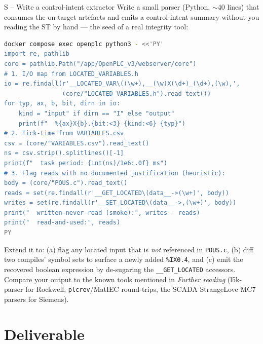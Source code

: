 \documentclass[11pt,a4paper]{article}
\begin{document}
\begin{stepbox}{S -- Write a control-intent extractor}
Write a small parser (Python, $\sim$40 lines) that consumes the on-target
artefacts and emits a control-intent summary without you reading the ST by
hand --- the seed of a real integrity tool:
\begin{lstlisting}[language=bash]
docker compose exec openplc python3 - <<'PY'
import re, pathlib
core = pathlib.Path("/app/OpenPLC_v3/webserver/core")
# 1. I/O map from LOCATED_VARIABLES.h
io = re.findall(r'__LOCATED_VAR\((\w+),__(\w)X(\d+)_(\d+),(\w),',
                (core/"LOCATED_VARIABLES.h").read_text())
for typ, ax, b, bit, dirn in io:
    kind = "input" if dirn == "I" else "output"
    print(f"  %{ax}X{b}.{bit:<3} {kind:<6} {typ}")
# 2. Tick-time from VARIABLES.csv
csv = (core/"VARIABLES.csv").read_text()
ns = csv.strip().splitlines()[-1]
print(f"  task period: {int(ns)/1e6:.0f} ms")
# 3. Flag reads with no documented justification (heuristic):
body = (core/"POUS.c").read_text()
reads = set(re.findall(r'__GET_LOCATED\(data__->(\w+)', body))
writes = set(re.findall(r'__SET_LOCATED\(data__->,(\w+)', body))
print("  written-never-read (smoke):", writes - reads)
print("  read-and-used:", reads)
PY
\end{lstlisting}
Extend it to: (a) flag any located input that is \emph{not} referenced in
\texttt{POUS.c}, (b) diff two compiles' symbol sets to surface a newly
added \texttt{\%IX0.4}, and (c) emit the recovered boolean expression by
de-sugaring the \texttt{\_\_GET\_LOCATED} accessors. Compare your output to
the known tools mentioned in \emph{Further reading} (l5k-parser for
Rockwell, \texttt{plcrev}/MatIEC round-trips, the SCADA StrangeLove MC7
parsers for Siemens).
\end{stepbox}

\section*{Deliverable}
\end{document}
